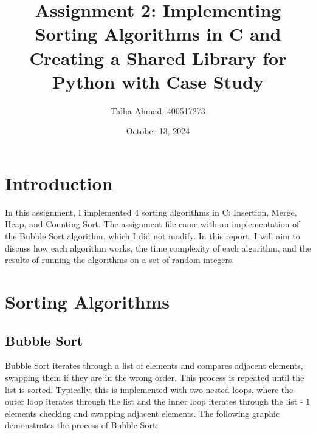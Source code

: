 \documentclass[12pt]{article}
\begin{document}
\title{Assignment 2: Implementing Sorting Algorithms in C and Creating a Shared Library for Python with Case Study}
\author{Talha Ahmad, 400517273}
\date{October 13, 2024}
\maketitle

\section{Introduction}

In this assignment, I implemented 4 sorting algorithms in C: Insertion, Merge, Heap, and Counting Sort.
The assignment file came with an implementation of the Bubble Sort algorithm, which I did not modify.
In this report, I will aim to discuss how each algorithm works, the time complexity of each algorithm, and the results of running the algorithms on a set of random integers.

\section{Sorting Algorithms}

\subsection{Bubble Sort}

Bubble Sort iterates through a list of elements and compares adjacent elements, swapping them if they are in the wrong order.
This process is repeated until the list is sorted.
Typically, this is implemented with two nested loops, where the outer loop iterates through the list and the inner loop iterates through the list - 1 elements checking and swapping adjacent elements.
The following graphic demonstrates the process of Bubble Sort:
\end{document}

